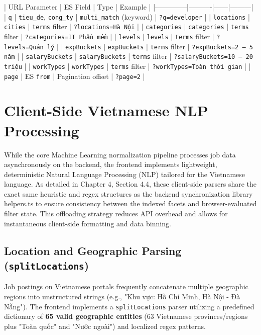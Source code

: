 | URL Parameter | ES Field | Type | Example |
|--------------|----------|------|---------|
| \texttt{q} | \texttt{tieu\_de}, \texttt{cong\_ty} | \texttt{multi\_match} (keyword) | \texttt{?q=developer} |
| \texttt{locations} | \texttt{cities} | \texttt{terms} filter | \texttt{?locations=Hà Nội} |
| \texttt{categories} | \texttt{categories} | \texttt{terms} filter | \texttt{?categories=IT Phần mềm} |
| \texttt{levels} | \texttt{levels} | \texttt{terms} filter | \texttt{?levels=Quản lý} |
| \texttt{expBuckets} | \texttt{expBuckets} | \texttt{terms} filter | \texttt{?expBuckets=2 – 5 năm} |
| \texttt{salaryBuckets} | \texttt{salaryBuckets} | \texttt{terms} filter | \texttt{?salaryBuckets=10 – 20 triệu} |
| \texttt{workTypes} | \texttt{workTypes} | \texttt{terms} filter | \texttt{?workTypes=Toàn thời gian} |
| \texttt{page} | ES \texttt{from} | Pagination offset | \texttt{?page=2} |

\section{Client-Side Vietnamese NLP Processing}
While the core Machine Learning normalization pipeline processes job data asynchronously on the backend, the frontend implements lightweight, deterministic Natural Language Processing (NLP) tailored for the Vietnamese language. As detailed in Chapter 4, Section 4.4, these client-side parsers share the exact same heuristic and regex structures as the backend synchronization library helpers.ts to ensure consistency between the indexed facets and browser-evaluated filter state. This offloading strategy reduces API overhead and allows for instantaneous client-side formatting and data binning.

\subsection{Location and Geographic Parsing (\texttt{splitLocations})}
Job postings on Vietnamese portals frequently concatenate multiple geographic regions into unstructured strings (e.g., "Khu vực: Hồ Chí Minh, Hà Nội - Đà Nẵng"). The frontend implements a \texttt{splitLocations} parser utilizing a predefined dictionary of \textbf{65 valid geographic entities} (63 Vietnamese provinces/regions plus "Toàn quốc" and "Nước ngoài") and localized regex patterns.

